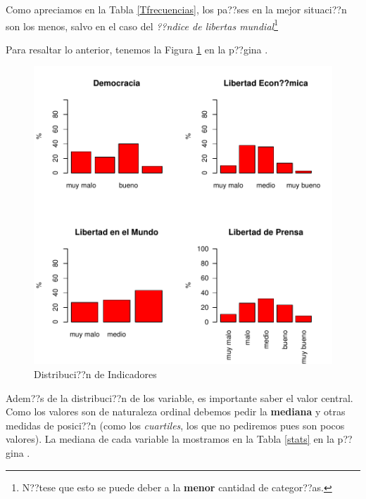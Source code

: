 Como apreciamos en la Tabla \ref{Tfrecuencias}, los pa??ses en la mejor situaci??n son los menos, salvo en el caso del \emph{??ndice de libertas mundial}\footnote{N??tese que esto se puede deber a la {\bf menor} cantidad de categor??as.}

\clearpage

Para resaltar lo anterior, tenemos la Figura \ref{barplots} en la p??gina \pageref{barplots}. 


\begin{figure}[h]
\centering
\includegraphics{paperVersion_7_univariada-barplots}
\caption{Distribuci??n de Indicadores}
\label{barplots}
\end{figure}

Adem??s de la distribuci??n de los variable, es importante saber el valor central. Como los valores son de naturaleza ordinal debemos pedir la {\bf mediana} y otras medidas de posici??n (como los \emph{cuartiles}, los que no pediremos pues son pocos valores). La mediana de cada variable la mostramos en la Tabla \ref{stats} en la p??gina \pageref{stats}.


